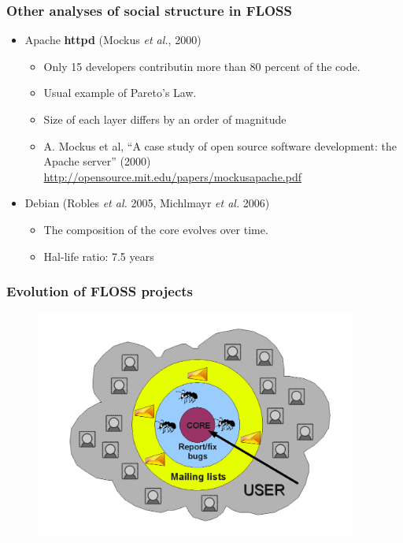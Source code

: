 \documentclass{beamer}
\begin{document}
\begin{frame}
 \frametitle{Other analyses of social structure in FLOSS}
 \begin{itemize}
  \item Apache \textbf{httpd} (Mockus \emph{et al.}, 2000)
  \begin{itemize}
   \item Only 15 developers contributin more than 80 percent
   of the code.
   \item Usual example of Pareto's Law.
   \item Size of each layer differs by an order of magnitude
    \item \begin{footnotesize}[Mockus 2000] A. Mockus et al, ``A case study of open source software development:
      the Apache server'' (2000)
      \url{http://opensource.mit.edu/papers/mockusapache.pdf}\end{footnotesize}
  \end{itemize}
  \item Debian (Robles \emph{et al.} 2005, Michlmayr \emph{et al.} 2006)
  \begin{itemize}
   \item The composition of the core evolves over time.
   \item Hal-life ratio: 7.5 years
  \end{itemize}
 \end{itemize}
\end{frame}


\begin{frame}
\frametitle{Evolution of FLOSS projects}
\begin{center}
\begin{figure}
 \includegraphics[height=7.5cm]{figs/progression.png}
\end{figure}
\end{center}
\end{frame}
\end{document}
